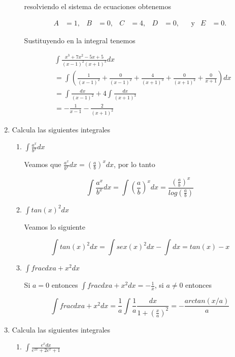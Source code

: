 \documentclass[letterpaper]{article}
\theoremstyle{definition}
\theoremstyle{definition}
\begin{document}
\begin{enumerate}
\begin{enumerate}
    resolviendo el sistema de ecuaciones obtenemos
    
    \begin{align*}
      A&=1, & B&=0, & C&=4, & D&=0, & &\text{y}& E&=0.
    \end{align*}
    
    Sustituyendo en la integral tenemos

    \begin{align*}
      &\int \frac{x^3+7x^2-5x+5}{(x-1)^2(x+1)^3}dx\\
      &= \int \left(\frac{1}{(x-1)^2}+ \frac{0}{(x-1)^2} + \frac{4}{(x+1)^3} + \frac{0}{(x+1)^2} + \frac{0}{x+1}\right)dx\\
      &= \int\frac{dx}{(x-1)^2} + 4\int\frac{dx}{(x+1)^3}\\
      &= -\frac{1}{x-1} - \frac{2}{(x+1)^2}
    \end{align*}

  \end{enumerate}

  \item Calcula las siguientes integrales
  
  \begin{enumerate}
    \item $\int \frac{a^x}{b^x}dx$
    
    Veamos que $\frac{a^x}{b^x}dx = \left(\frac{a}{b}\right)^xdx$, por lo tanto

    \[\int \frac{a^x}{b^x}dx = \int \left(\frac{a}{b}\right)^xdx = \frac{\left(\frac{a}{b}\right)^x}{log(\frac{a}{b})}\]

    \item $\int tan(x)^2dx$
    
    Veamos lo siguiente

    \[\int tan(x)^2dx = \int sex(x)^2dx - \int dx = tan(x) - x\]

    \item $\int frac{dx}{a+x^2}dx$
    
    Si $a = 0$ entonces $\int frac{dx}{a+x^2}dx = -\frac{1}{x}$, si $a \neq 0$ entonces

    \[\int frac{dx}{a+x^2}dx = \frac{1}{a} \int \frac{1}{a} \frac{dx}{1 + \left(\frac{x}{a}\right)^2} = -\frac{arctan(x/a)}{a}\]
  \end{enumerate}

  \item Calcula las siguientes integrales
  
  \begin{enumerate}
    \item $\int \frac{e^xdx}{e^{2x} + 2e^x + 1}$
    

\end{enumerate}
\end{enumerate}
\end{document}
